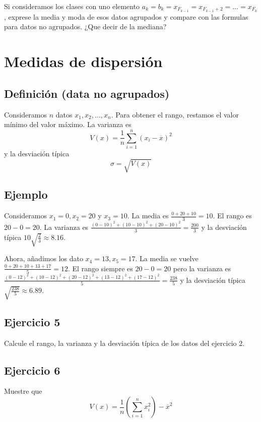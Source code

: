 Si consideramos los clases con uno elemento
$a_k = b_k = x_{F_{k-1}} = x_{F_{k-1}+2} = \ldots = x_{F_{k}}$, exprese
la media y moda de esos datos agrupados y compare con las formulas para
datos no agrupados. ¿Que decir de la mediana?

\section{Medidas de dispersión}

\subsection{Definición (data no agrupados)}

Consideramos $n$ datos $x_1, x_2, \ldots, x_n$. Para obtener el rango, restamos el
valor mínimo del valor máximo. La varianza es
$$
V(x) =
\frac{1}{n}
\sum_{i=1}^n \left(x_i - \overline{x}\right)^2
$$
y la desviación típica
$$
\sigma = \sqrt{V(x)}
$$

\subsection{Ejemplo}

Consideramos $x_1 = 0, x_2 = 20$ y $x_3 = 10$. La media es
$\frac{0+20+10}{3} = 10$. El rango es $20 - 0 = 20$. La varianza es
$\frac{\left(0-10\right)^2 + \left(10-10\right)^2 + \left(20-10\right)^2}{3}
= \frac{200}{3}$ y la desviación típica
$10 \sqrt{\frac{2}{3}} \approx 8.16$.

Ahora, añadimos los dato $x_4 = 13, x_5 = 17$. La media se vuelve
$\frac{0+20+10+13+17}{5} = 12$. El rango siempre es $20 - 0 = 20$ pero
la varianza es 
$\frac{\left(0-12\right)^2 + \left(10-12\right)^2 + \left(20-12\right)^2
+ \left(13-12\right)^2 + \left(17-12\right)^2}{5}
= \frac{238}{5}$ y la desviación típica
$\sqrt{\frac{238}{5}} \approx 6.89$.

\subsection{Ejercicio 5}

Calcule el rango, la varianza y la desviación típica de los datos del
ejercicio 2.

\subsection{Ejercicio 6}

Muestre que 
$$
V(x) =
\frac{1}{n}
\left(\sum_{i=1}^n x_i^2\right) - \overline{x}^2
$$

